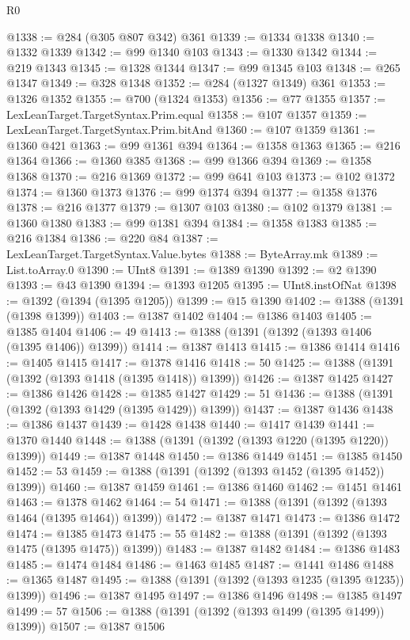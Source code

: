 \begin{lexlean}{R0}
\begin{coremodule}
@1338 := @284 (@305 @807 @342) @361
@1339 := @1334 @1338
@1340 := @1332 @1339
@1342 := @99 @1340 @103
@1343 := @1330 @1342
@1344 := @219 @1343
@1345 := @1328 @1344
@1347 := @99 @1345 @103
@1348 := @265 @1347
@1349 := @328 @1348
@1352 := @284 (@1327 @1349) @361
@1353 := @1326 @1352
@1355 := @700 (@1324 @1353)
@1356 := @77 @1355
@1357 := LexLeanTarget.TargetSyntax.Prim.equal
@1358 := @107 @1357
@1359 := LexLeanTarget.TargetSyntax.Prim.bitAnd
@1360 := @107 @1359
@1361 := @1360 @421
@1363 := @99 @1361 @394
@1364 := @1358 @1363
@1365 := @216 @1364
@1366 := @1360 @385
@1368 := @99 @1366 @394
@1369 := @1358 @1368
@1370 := @216 @1369
@1372 := @99 @641 @103
@1373 := @102 @1372
@1374 := @1360 @1373
@1376 := @99 @1374 @394
@1377 := @1358 @1376
@1378 := @216 @1377
@1379 := @1307 @103
@1380 := @102 @1379
@1381 := @1360 @1380
@1383 := @99 @1381 @394
@1384 := @1358 @1383
@1385 := @216 @1384
@1386 := @220 @84
@1387 := LexLeanTarget.TargetSyntax.Value.bytes
@1388 := ByteArray.mk
@1389 := List.toArray.{0}
@1390 := UInt8
@1391 := @1389 @1390
@1392 := @2 @1390
@1393 := @43 @1390
@1394 := @1393 @1205
@1395 := UInt8.instOfNat
@1398 := @1392 (@1394 (@1395 @1205))
@1399 := @15 @1390
@1402 := @1388 (@1391 (@1398 @1399))
@1403 := @1387 @1402
@1404 := @1386 @1403
@1405 := @1385 @1404
@1406 := 49
@1413 := @1388 (@1391 (@1392 (@1393 @1406 (@1395 @1406)) @1399))
@1414 := @1387 @1413
@1415 := @1386 @1414
@1416 := @1405 @1415
@1417 := @1378 @1416
@1418 := 50
@1425 := @1388 (@1391 (@1392 (@1393 @1418 (@1395 @1418)) @1399))
@1426 := @1387 @1425
@1427 := @1386 @1426
@1428 := @1385 @1427
@1429 := 51
@1436 := @1388 (@1391 (@1392 (@1393 @1429 (@1395 @1429)) @1399))
@1437 := @1387 @1436
@1438 := @1386 @1437
@1439 := @1428 @1438
@1440 := @1417 @1439
@1441 := @1370 @1440
@1448 := @1388 (@1391 (@1392 (@1393 @1220 (@1395 @1220)) @1399))
@1449 := @1387 @1448
@1450 := @1386 @1449
@1451 := @1385 @1450
@1452 := 53
@1459 := @1388 (@1391 (@1392 (@1393 @1452 (@1395 @1452)) @1399))
@1460 := @1387 @1459
@1461 := @1386 @1460
@1462 := @1451 @1461
@1463 := @1378 @1462
@1464 := 54
@1471 := @1388 (@1391 (@1392 (@1393 @1464 (@1395 @1464)) @1399))
@1472 := @1387 @1471
@1473 := @1386 @1472
@1474 := @1385 @1473
@1475 := 55
@1482 := @1388 (@1391 (@1392 (@1393 @1475 (@1395 @1475)) @1399))
@1483 := @1387 @1482
@1484 := @1386 @1483
@1485 := @1474 @1484
@1486 := @1463 @1485
@1487 := @1441 @1486
@1488 := @1365 @1487
@1495 := @1388 (@1391 (@1392 (@1393 @1235 (@1395 @1235)) @1399))
@1496 := @1387 @1495
@1497 := @1386 @1496
@1498 := @1385 @1497
@1499 := 57
@1506 := @1388 (@1391 (@1392 (@1393 @1499 (@1395 @1499)) @1399))
@1507 := @1387 @1506

\end{coremodule}
\end{lexlean}
